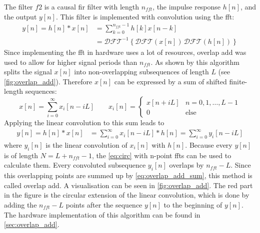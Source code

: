 \documentclass[12pt,a4paper,parskip=full,abstract=true,BCOR=12mm,twoside,open=right]{scrreprt}
\begin{document}
The filter $f2$ is a causal \gls{fir} filter with length $n_{fft}$, the impulse response $h[n]$, and the output $y[n]$. This filter is
implemented with convolution using the \gls{fft}:
\begin{equation}
    \begin{split}
     \label{eq:circ} y[n] = h[n] * x[n] & = \sum_{k=0}^{n_{fft}-1} h[k]x[n-k]\\
         & = \mathcal{DFT}^{-1}\left\{\mathcal{DFT}(x[n])\,\mathcal{DFT}(h[n])\right\}
    \end{split}
\end{equation}
Since implementing the \gls{fft} in hardware uses a lot of resources, overlap add
was used to allow for higher signal periods than $n_{fft}$. As shown by \cite{schaums_2011}
this algorithm splits the signal $x[n]$ into non-overlapping
subsequences of length $L$ (see \cref{fig:overlap_add}). Therefore $x[n]$ can
be expressed by a sum of shifted finite-length sequences:
\begin{equation}
    \label{eq:sum_seq} x[n] = \sum_{i=0}^{\infty} x_i[n-iL] \qquad x_i[n] =\begin{cases}
        x[n+iL] & n = 0, 1, \ldots, L-1\\
        0 & \text{else} \end{cases}
\end{equation}
Applying the linear convolution to this sum leads to
\begin{equation}
    \begin{split}\label{eq:overlap_add_sum}
        y[n] = h[n] * x[n] & = \sum_{i=0}^{\infty} x_i[n-iL] * h[n] = \sum_{i=0}^{\infty} y_i[n-iL]
    \end{split}
\end{equation}
where $y_i[n]$ is the linear convolution of $x_i[n]$ with $h[n]$. Because every $y[n]$ is of length
$N = L + n_{fft} -1$, the \cref{eq:circ} with n-point \glspl{fft} can be used to calculate them.
Every convoluted subsequence $y_i[n]$ overlaps by $n_{fft} - L$. Since this overlapping
points are summed up by \cref{eq:overlap_add_sum}, this method is called overlap
add. A visualisation can be seen in \cref{fig:overlap_add}. The red part in the figure
is the circular extension of the linear convolution, which is done by adding the
$n_{fft} - L$ points after the sequence $y[n]$ to the beginning of $y[n]$. The hardware implementation
of this algorithm can be found in \cref{sec:overlap_add}.
\end{document}
